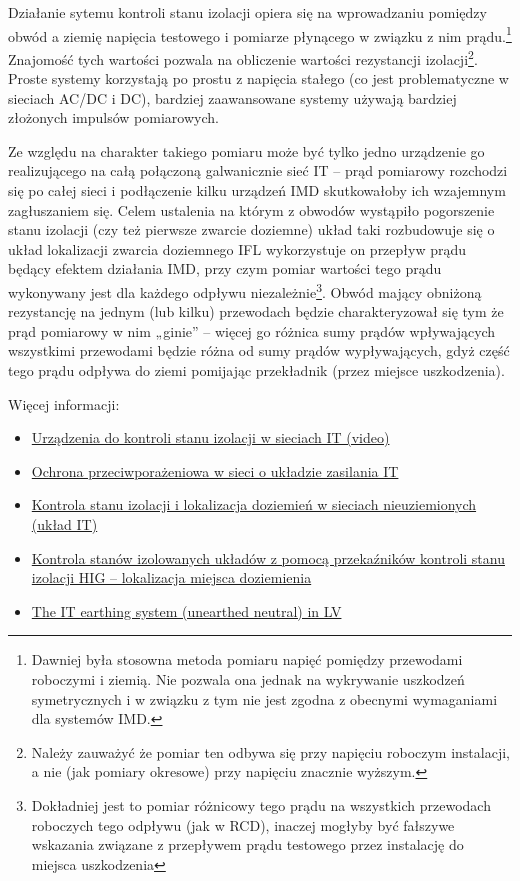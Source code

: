 Działanie sytemu kontroli stanu izolacji opiera się na wprowadzaniu pomiędzy obwód a ziemię napięcia testowego i pomiarze płynącego w związku z nim prądu.\footnote{
	Dawniej była stosowna metoda pomiaru napięć pomiędzy przewodami roboczymi i ziemią. Nie pozwala ona jednak na wykrywanie uszkodzeń symetrycznych i w związku z tym nie jest zgodna z obecnymi wymaganiami dla systemów IMD.
}
Znajomość tych wartości pozwala na obliczenie wartości rezystancji izolacji\footnote{
	Należy zauważyć że pomiar ten odbywa się przy napięciu roboczym instalacji, a nie (jak pomiary okresowe) przy napięciu znacznie wyższym.
}.
Proste systemy korzystają po prostu z napięcia stałego (co jest problematyczne w sieciach AC/DC i DC), bardziej zaawansowane systemy używają bardziej złożonych impulsów pomiarowych.

Ze względu na charakter takiego pomiaru może być tylko jedno urządzenie go realizującego na całą połączoną galwanicznie sieć IT
	– prąd pomiarowy rozchodzi się po całej sieci i podłączenie kilku urządzeń IMD skutkowałoby ich wzajemnym zagłuszaniem się.
Celem ustalenia na którym z obwodów wystąpiło pogorszenie stanu izolacji (czy też pierwsze zwarcie doziemne) układ taki rozbudowuje się o układ lokalizacji zwarcia doziemnego IFL
	wykorzystuje on przepływ prądu będący efektem działania IMD, przy czym pomiar wartości tego prądu wykonywany jest dla każdego odpływu niezależnie\footnote{
		Dokładniej jest to pomiar różnicowy tego prądu na wszystkich przewodach roboczych tego odpływu (jak w RCD), inaczej mogłyby być fałszywe wskazania związane z przepływem prądu testowego przez instalację do miejsca uszkodzenia
	}.
Obwód mający obniżoną rezystancję na jednym (lub kilku) przewodach będzie charakteryzował się tym że prąd pomiarowy w nim „ginie”
	– więcej go różnica sumy prądów wpływających wszystkimi przewodami będzie różna od sumy prądów wypływających, gdyż część tego prądu odpływa do ziemi pomijając przekładnik (przez miejsce uszkodzenia).

\vspace{7pt}\noindent
Więcej informacji:
\begin{itemize}
	\item \href{https://www.youtube.com/watch?v=fs5UW-PUpLE}{Urządzenia do kontroli stanu izolacji w sieciach IT (video)}
	\item \href{https://elektroenergetyka.pl/upload/file/2020/04/wiatr_kwiecien_2020.pdf}{Ochrona przeciwporażeniowa w sieci o układzie zasilania IT}
	\item \href{https://www.promac.com.pl/wp-content/uploads/2018/11/Kontrola-izolacji-lokalizacja-IT.pdf}{Kontrola stanu izolacji i lokalizacja doziemień w sieciach nieuziemionych (układ IT)}
	\item \href{https://www.repostechnik.pl/wp-content/uploads/2017/05/HIG-IFL1_PL.pdf}{Kontrola stanów izolowanych układów z pomocą przekaźników kontroli stanu izolacji HIG – lokalizacja miejsca doziemienia}
	\item \href{https://www.studiecd.dk/cahiers_techniques/The_IT_system_earthing_in_LV.pdf}{The IT earthing system (unearthed neutral) in LV}
\end{itemize}


